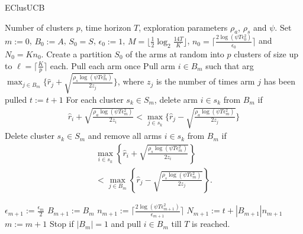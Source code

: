 
\begin{algorithm}[!h]
\caption{EClusUCB}
\label{alg:eclusucb}
\begin{algorithmic}
 Number of clusters $p$, time horizon $T$, exploration parameters $\rho_a$, $\rho_s$ and $\psi$.
 Set $m:=0$, $B_{0}:=A$, $S_0 = S$, $\epsilon_{0}:=1$, $M=\big \lfloor \frac{1}{2}\log_{2} \frac{14T}{K}\big\rfloor$, $n_{0}=\bigg\lceil\frac{2\log{(\psi T\epsilon_{0}^{2})}}{\epsilon_{0}}\bigg\rceil$ and  $N_{0}=Kn_{0}$.
\State Create a partition $S_0$ of the arms at random into $p$ clusters of size up to $\ell=\bigg\lceil \frac{K}{p} \bigg\rceil$ each.
\State Pull each arm once
\State Pull arm $i\in B_m$ such that arg$\max_{j\in B_{m}}\bigg\lbrace \hat{r}_{j} + \sqrt{\frac{\rho_{s}\log{(\psi T\epsilon_{m}^{2})}}{2 z_{j}}} \bigg\rbrace$, where $z_j$ is the number of times arm $j$ has been pulled
\State $t:=t+1$
\ArmElim
\State For each cluster $s_k \in S_{m}$, delete arm ${i}\in s_{k}$ from $B_{m}$ if
\begin{align*}
\hat{r}_{i} + \sqrt{\frac{\rho_{a}\log{(\psi T\epsilon_{m}^{2})}}{2 z_{i}}}  < \max_{{j}\in s_{k}}\bigg\lbrace\hat{r}_{j} -\sqrt{\frac{\rho_{a}\log{(\psi T\epsilon_{m}^{2})}}{2 z_{j}}} \bigg\rbrace
\end{align*}
\EndArmElim
\ClusElim
\State Delete cluster $s_{k}\in S_{m}$ and remove all arms $i\in s_{k}$ from $B_{m}$ if 
\begin{align*}
 \max_{{i}\in s_{k}}\left\lbrace\hat{r}_{i} + \sqrt{\frac{\rho_{s}\log{(\psi T\epsilon_{m}^{2})}}{2 z_{i}}}\right\rbrace \\
 < \max_{{j}\in B_{m}} \left\lbrace\hat{r}_{j} - \sqrt{\frac{\rho_{s} \log{(\psi T\epsilon_{m}^{2})}}{2 z_{j}}}\right\rbrace.
\end{align*}
\EndClusElim

\State $\epsilon_{m+1}:=\frac{\epsilon_{m}}{2}$\vspace{0.5ex}
\State $B_{m+1}:=B_{m}$
\State $n_{m+1}:=\bigg\lceil\frac{2\log{(\psi T\epsilon_{m+1}^{2})}}{\epsilon_{m+1}}\bigg\rceil$
\State $N_{m+1}:=t+|B_{m+1}| n_{m+1}$
\State $m:=m+1$
\State Stop if $|B_{m}|=1$ and pull ${i}\in B_{m}$ till $T$ is reached.
\EndIf
\EndFor
\end{algorithmic}
\end{algorithm}


